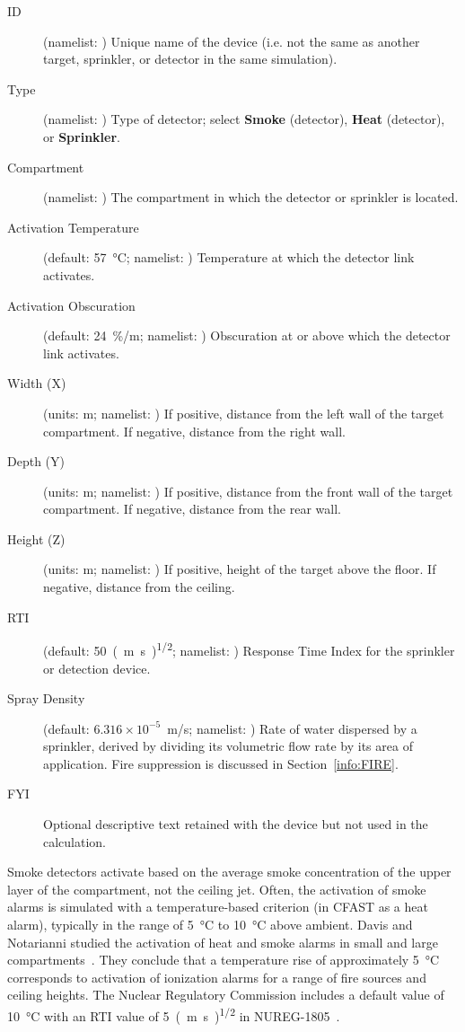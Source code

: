 {{\begin{description}
\item[ID]  (namelist: ) Unique name of the device (i.e. not the same as another target, sprinkler, or detector in the same simulation).
\item[Type] (namelist: ) Type of detector; select \textbf{Smoke} (detector), \textbf{Heat} (detector), or \textbf{Sprinkler}.
\item[Compartment] (namelist: ) The compartment in which the detector or sprinkler is located.
\item[Activation Temperature] (default: 57~\unit{\degreeCelsius}; namelist: ) Temperature at which the detector link activates.
\item[Activation Obscuration] (default: 24~\unit{\%/m}; namelist: ) Obscuration at or above which the detector link activates.
\item[Width (X)] (units: \unit{m}; namelist: ) If positive, distance from the left wall of the target compartment. If negative, distance from the right wall.
\item[Depth (Y)] (units: \unit{m}; namelist: ) If positive, distance from the front wall of the target compartment. If negative, distance from the rear wall.
\item[Height (Z)] (units: \unit{m}; namelist: ) If positive, height of the target above the floor. If negative, distance from the ceiling.
\item[RTI] (default: 50~\unit{(m.s)\tothe{1/2}}; namelist: ) Response Time Index for the sprinkler or detection device.
\item[Spray Density] (default: $6.316\times 10^{-5}$~\unit{m/s}; namelist: ) Rate of water dispersed by a sprinkler, derived by dividing its volumetric flow rate by its area of application. Fire suppression is discussed in Section~\ref{info:FIRE}.
\item[FYI]  Optional descriptive text retained with the device but not used in the calculation.
\end{description}
Smoke detectors activate based on the average smoke concentration of the upper layer of the compartment, not the ceiling jet. Often, the activation of smoke alarms is simulated with a temperature-based criterion (in CFAST as a heat alarm), typically in the range of 5~\unit{\degreeCelsius} to 10~\unit{\degreeCelsius} above ambient. Davis and Notarianni  studied the activation of heat and smoke alarms in small and large compartments~\cite{Davis:1996}. They conclude that a temperature rise of approximately 5~\unit{\degreeCelsius} corresponds to activation of ionization alarms for a range of fire sources and ceiling heights. The Nuclear Regulatory Commission includes a default value of 10~\unit{\degreeCelsius} with an RTI value of 5~\unit{(m.s)\tothe{1/2}} in NUREG-1805~\cite{NRCNUREG1805}.


}}
